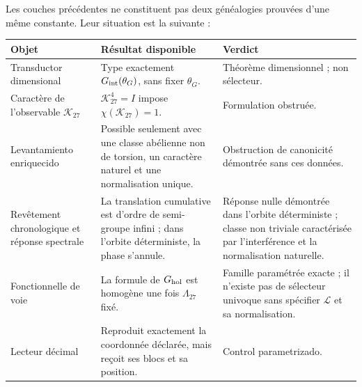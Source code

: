 Les couches précédentes ne constituent pas deux généalogies prouvées d'une même
constante. Leur situation est la suivante :
\begin{center}
\begin{tabularx}{0.96\textwidth}{@{}L{0.25\textwidth}Y L{0.26\textwidth}@{}}
\toprule
Objet & Résultat disponible & Verdict\\
\midrule
Transductor dimensional &
Type exactement \(G_{\rm int}(\theta_G)\), sans fixer \(\theta_G\). &
Théorème dimensionnel ; non sélecteur.\\
Caractère de l'observable \(\mathcal K_{27}\) &
\(\mathcal K_{27}^4=I\) impose
\(\chi(\mathcal K_{27})=1\). &
Formulation obstruée.\\
Levantamiento enriquecido &
Possible seulement avec une classe abélienne non de torsion, un caractère naturel et une
normalisation unique. &
Obstruction de canonicité démontrée sans ces données.\\
Revêtement chronologique et réponse spectrale &
La translation cumulative est d'ordre de semi-groupe infini ; dans l'orbite
déterministe, la phase s'annule. &
Réponse nulle démontrée dans l'orbite déterministe ; classe non triviale
caractérisée par l'interférence et la normalisation naturelle.\\
Fonctionnelle de voie &
La formule de \(G_{\rm hol}\) est homogène une fois
\(\Lambda_{27}\) fixé. &
Famille paramétrée exacte ; il n'existe pas de sélecteur univoque sans spécifier
\(\mathscr L\) et sa normalisation.\\
Lecteur décimal &
Reproduit exactement la coordonnée déclarée, mais reçoit ses blocs et sa
position. &
Control parametrizado.\\
\bottomrule
\end{tabularx}
\end{center}

